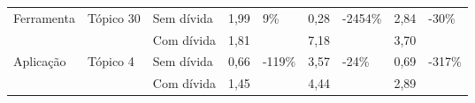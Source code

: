 \begin{longtable}{|l|l|l|l|l|l|l|l|l|}
\multirow{2}{*}{Ferramenta}    & \multirow{2}{*}{Tópico 30} & Sem dívida              & 1,99            & \multirow{2}{*}{9\%}    & 0,28            & \multirow{2}{*}{-2454\%} & 2,84            & \multirow{2}{*}{-30\%}  \\ \cline{3-4} \cline{6-6} \cline{8-8}
                               &                            & Com dívida           & 1,81            &                         & 7,18            &                          & 3,70            &                         \\ \hline
\multirow{2}{*}{Aplicação}     & \multirow{2}{*}{Tópico 4}  & Sem dívida              & 0,66            & \multirow{2}{*}{-119\%} & 3,57            & \multirow{2}{*}{-24\%}   & 0,69            & \multirow{2}{*}{-317\%} \\ \cline{3-4} \cline{6-6} \cline{8-8}
                               &                            & Com dívida           & 1,45            &                         & 4,44            &                          & 2,89            &                         \\ \hline


\end{longtable}
